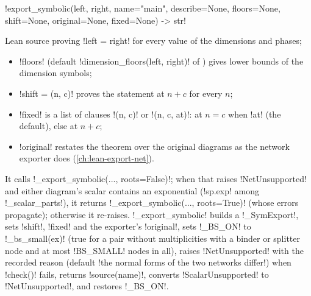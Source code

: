 {{{\begin{signature}
\lexpy!export_symbolic(left, right, name="main", describe=None, floors=None, shift=None, original=None, fixed=None) -> str!
\end{signature}
Lean source proving \lexpy!left = right! for every value of the dimensions and phases;
\begin{itemize}
\item \lexpy!floors! (default \lexpy!dimension_floors(left, right)! of
) gives lower bounds of the dimension symbols;
\item \lexpy!shift = (n, c)! proves the statement at $n+c$ for every $n$;
\item \lexpy!fixed! is a list of clauses \lexpy!(n, c)! or \lexpy!(n, c, at)!: at $n=c$ when \lexpy!at! (the
default), else at $n + c$;
\item \lexpy!original! restates the theorem over the original diagrams as the network exporter
does (\cref{ch:lean-export-net}).
\end{itemize}
It calls \lexpy!_export_symbolic(..., roots=False)!; when that raises \lexpy!NetUnsupported! and
either diagram's scalar contains an exponential (\lexpy!sp.exp! among \lexpy!_scalar_parts!), it
returns \lexpy!_export_symbolic(..., roots=True)! (whose errors propagate); otherwise it re-raises.
\lexpy!_export_symbolic! builds a \lexpy!_SymExport!, sets \lexpy!shift!, \lexpy!fixed! and the exporter's
\lexpy!original!, sets \lexpy!_BS_ON! to \lexpy!_bs_small(ex)! (true for a pair without multiplicities
with a binder or splitter node and at most \lexpy!BS_SMALL! nodes in all), raises
\lexpy!NetUnsupported! with the recorded reason (default
\lexcode!the normal forms of the two networks differ!) when \lexpy!check()! fails, returns
\lexpy!source(name)!, converts \lexpy!ScalarUnsupported! to \lexpy!NetUnsupported!, and restores
\lexpy!_BS_ON!.

}}}
